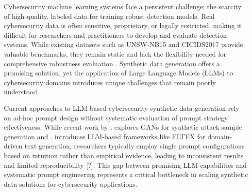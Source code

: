 


Cybersecurity machine learning systems face a persistent challenge: the scarcity of high-quality, labeled data for training robust detection models. Real cybersecurity data is often sensitive, proprietary, or legally restricted, making it difficult for researchers and practitioners to develop and evaluate detection systems. While existing datasets such as UNSW-NB15 \cite{moustafa2015unsw} and CICIDS2017 \cite{cicids2017} provide valuable benchmarks, they remain static and lack the flexibility needed for comprehensive robustness evaluation \cite{sharafaldin2018toward}. Synthetic data generation offers a promising solution, yet the application of Large Language Models (LLMs) to cybersecurity domains introduces unique challenges that remain poorly understood.

Current approaches to LLM-based cybersecurity synthetic data generation rely on ad-hoc prompt design without systematic evaluation of prompt strategy effectiveness. While recent work by \cite{rahman2025leveraging}. explores GANs for synthetic attack sample generation and \cite{razmyslovich2025eltex}. introduces LLM-based frameworks like ELTEX for domain-driven text generation, researchers typically employ single prompt configurations based on intuition rather than empirical evidence, leading to inconsistent results and limited reproducibility [?]. This gap between promising LLM capabilities and systematic prompt engineering represents a critical bottleneck in scaling synthetic data solutions for cybersecurity applications.

